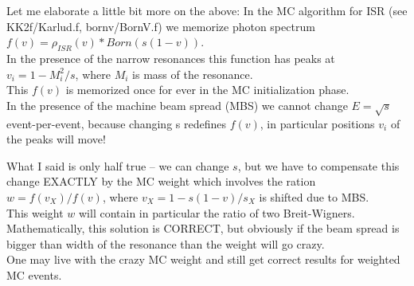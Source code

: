 \documentclass[dvips]{seminar}                      %
\begin{document}
\begin{slide}


Let me elaborate a little bit more on the above:
In the MC algorithm for ISR (see KK2f/Karlud.f, bornv/BornV.f) we memorize
photon spectrum $f(v)=\rho_{ISR}(v)*Born(s(1-v))$.\\
In the presence of the narrow resonances
this function has peaks at $v_i=1-M_i^2/s$, where $M_i$ is mass of the resonance.\\
This $f(v)$ is memorized once for ever in the MC initialization phase.\\
In the presence of the machine beam spread (MBS) we cannot change $E=\sqrt{s}$
event-per-event, because changing s redefines $f(v)$, in particular positions $v_i$
of the peaks will move!

What I said is only half true -- we can change $s$, but
we have to compensate this change EXACTLY by the MC weight which involves
the ration $w=f(v_X)/f(v)$, where $v_X = 1-s(1-v)/s_X$ is shifted due to MBS.\\
This weight $w$ will contain in particular the ratio of two Breit-Wigners.\\
Mathematically, this solution is CORRECT, but obviously
if the beam spread is bigger than width of the resonance than the weight will go crazy.\\
One may live with the crazy MC weight and still get correct results for weighted
MC events.

\vfill
\end{slide}    %
\end{document}
